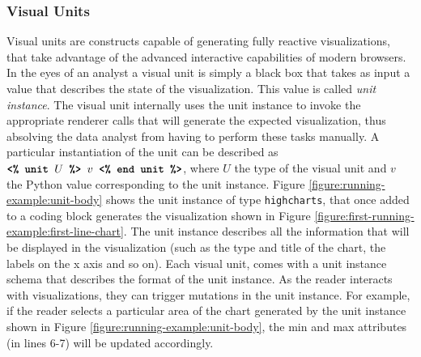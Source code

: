 



\subsubsection*{Visual Units}
Visual units are constructs capable of generating fully reactive visualizations, that take advantage of the advanced interactive capabilities of modern browsers. In the eyes of an analyst a visual unit is simply a black box that takes as input a value that describes the state of the visualization. This value is called \emph{unit instance}. The visual unit internally uses the unit instance to invoke the appropriate renderer calls that will generate the expected visualization, thus absolving the data analyst from having to perform these tasks manually. A particular instantiation of the unit  can be described as $\texttt{\textbf{<\% unit }} U \texttt{\textbf{ \%> }} v \texttt{\textbf{ <\% end unit \%>}}$, where $U$ the type of the visual unit and $v$ the Python value corresponding to the unit instance. Figure \ref{figure:running-example:unit-body} shows the unit instance of type \texttt{highcharts}, that once added to a coding block generates the visualization shown in Figure \ref{figure:first-running-example:first-line-chart}. The unit instance describes all the information that will be displayed in the visualization (such as the type and title of the chart, the labels on the x axis and so on). Each visual unit, comes with a unit instance schema that describes the format of the unit instance. As the reader interacts with visualizations, they can trigger mutations in the unit instance. For example, if the reader selects a particular area of the chart generated by the unit instance shown in Figure \ref{figure:running-example:unit-body}, the min and max attributes (in lines 6-7) will be updated accordingly.



